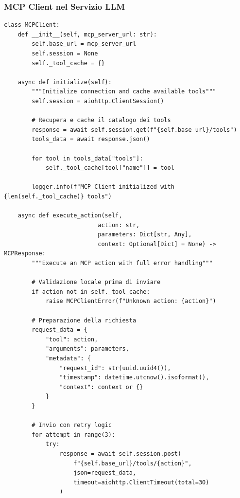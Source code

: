 \subsubsection{MCP Client nel Servizio LLM}
\begin{listing}[H]
\begin{verbatim}
class MCPClient:
    def __init__(self, mcp_server_url: str):
        self.base_url = mcp_server_url
        self.session = None
        self._tool_cache = {}
    
    async def initialize(self):
        """Initialize connection and cache available tools"""
        self.session = aiohttp.ClientSession()
        
        # Recupera e cache il catalogo dei tools
        response = await self.session.get(f"{self.base_url}/tools")
        tools_data = await response.json()
        
        for tool in tools_data["tools"]:
            self._tool_cache[tool["name"]] = tool
        
        logger.info(f"MCP Client initialized with {len(self._tool_cache)} tools")
    
    async def execute_action(self, 
                           action: str, 
                           parameters: Dict[str, Any],
                           context: Optional[Dict] = None) -> MCPResponse:
        """Execute an MCP action with full error handling"""
        
        # Validazione locale prima di inviare
        if action not in self._tool_cache:
            raise MCPClientError(f"Unknown action: {action}")
        
        # Preparazione della richiesta
        request_data = {
            "tool": action,
            "arguments": parameters,
            "metadata": {
                "request_id": str(uuid.uuid4()),
                "timestamp": datetime.utcnow().isoformat(),
                "context": context or {}
            }
        }
        
        # Invio con retry logic
        for attempt in range(3):
            try:
                response = await self.session.post(
                    f"{self.base_url}/tools/{action}",
                    json=request_data,
                    timeout=aiohttp.ClientTimeout(total=30)
                )
                

\end{verbatim}
\end{listing}
